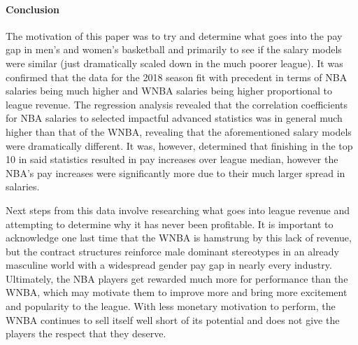 \documentclass[12pt]{article}
\begin{document}
\paragraph{Conclusion}
The motivation of this paper was to try and determine what goes into the pay gap in men’s and women’s basketball 
and primarily to see if the salary models were similar (just dramatically scaled down in the much poorer league). 
It was confirmed that the data for the 2018 season fit with precedent in terms of NBA salaries being much higher 
and WNBA salaries being higher proportional to league revenue. The regression analysis revealed that the 
correlation coefficients for NBA salaries to selected impactful advanced statistics was in general much higher 
than that of the WNBA, revealing that the aforementioned salary models were dramatically different. It was, 
however, determined that finishing in the top 10 in said statistics resulted in pay increases over league median, 
however the NBA’s pay increases were significantly more due to their much larger spread in salaries. 
\par
Next steps from this data involve researching what goes into league revenue and attempting to determine why it 
has never been profitable. It is important to acknowledge one last time that the WNBA is hamstrung by this lack 
of revenue, but the contract structures reinforce male dominant stereotypes in an already masculine world with a 
widespread gender pay gap in nearly every industry. Ultimately, the NBA players get rewarded much more for 
performance than the WNBA, which may motivate them to improve more and bring more excitement and popularity to the league. 
With less monetary motivation to perform, the WNBA continues to sell itself well short of its potential and does 
not give the players the respect that they deserve. 






\end{document}
